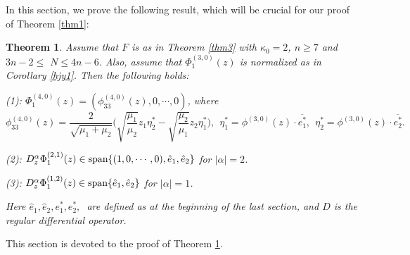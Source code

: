 \documentclass[12pt]{article}
\numberwithin{equation}{section}
\def\ov{\overline}
\newtheorem{theorem}{Theorem}[section]
\begin{document}
In this section, we prove the following result, which will be
crucial for our proof of Theorem \ref{thm1}:

\begin{theorem} \label{prop11} Assume that $F$ is as in Theorem \ref{thm3} with
$\kappa_0=2$, {$n\ge 7$} and {$3n-2\le $} $N\le 4n-6$. Also, assume
that $\Phi_1^{(3,0)}(z)$ is normalized as in Corollary \ref{hjy1}.
Then the following holds:

\noindent (1):
$\Phi_1^{(4,0)}(z)=(\phi_{33}^{(4,0)}(z),0,\cdots,0)$, where
\[
\phi^{(4,0)}_{33}(z)=\frac{ 2 }{\sqrt{\mu_1+\mu_2}}
\bigg(\sqrt{\frac{\mu_1}{\mu_2}}z_1 \eta_2^*  -
\sqrt{\frac{\mu_2}{\mu_1}} z_2 \eta_1^* \bigg),\ \ \eta_1^* =
\phi^{(3,0)}(z)\cdot \ov{e_1^*},\ \ \eta_2^* = \phi^{(3,0)}(z)\cdot
\ov{e_2^*}.
\]

\noindent (2): $D^{\alpha}_z\Phi_1^{(2,1)}(z)\in \hbox{span}
\{(1,0,\cdots,0), \hat{e}_1,\hat{e}_2\}$ for $|\alpha|=2$.

\noindent (3): $D^{\alpha}_z\Phi_1^{(1,2)}(z)\in \hbox{span}
\{\hat{e}_1,\hat{e}_2\}$ for $|\alpha|=1$.

\noindent Here $\hat{e}_1, \hat{e}_2, e_1^*, e_2^*,\ $ are  defined
as at the beginning of the last section, and { $D$ is the regular
differential operator.}
\end{theorem}


This section is devoted to the proof of  Theorem \ref{prop11}.
\end{document}
